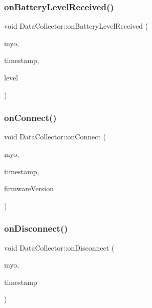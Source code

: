 \mbox{\label{class_data_collector_a56a6c61925d54439459fc1599f76c601}} 
\subsubsection{on\+Battery\+Level\+Received()}
{\footnotesize\ttfamily void Data\+Collector\+::on\+Battery\+Level\+Received (\begin{DoxyParamCaption}\item[{myo\+::\+Myo $\ast$}]{myo,  }\item[{uint64\+\_\+t}]{timestamp,  }\item[{uint8\+\_\+t}]{level }\end{DoxyParamCaption})}

\mbox{\label{class_data_collector_a8e6ee72005537474eb45f2a9310fa540}} 
\subsubsection{on\+Connect()}
{\footnotesize\ttfamily void Data\+Collector\+::on\+Connect (\begin{DoxyParamCaption}\item[{myo\+::\+Myo $\ast$}]{myo,  }\item[{uint64\+\_\+t}]{timestamp,  }\item[{myo\+::\+Firmware\+Version}]{firmware\+Version }\end{DoxyParamCaption})}

\mbox{\label{class_data_collector_a89d1d780cdf635c607707f90b0665d50}} 
\subsubsection{on\+Disconnect()}
{\footnotesize\ttfamily void Data\+Collector\+::on\+Disconnect (\begin{DoxyParamCaption}\item[{myo\+::\+Myo $\ast$}]{myo,  }\item[{uint64\+\_\+t}]{timestamp }\end{DoxyParamCaption})}

